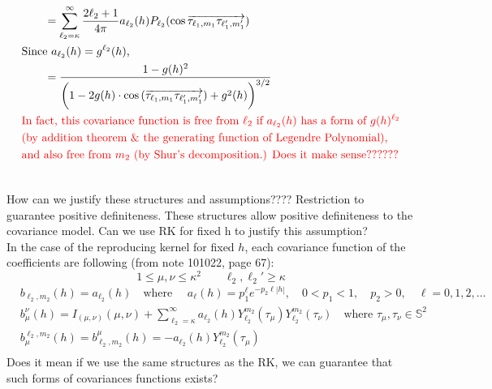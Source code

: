 \documentclass[11pt]{article}
\begin{document}
\begin{itemize}
\begin{align*}
&\quad \quad = \sum_{\ell_2=\kappa}^{\infty} \frac{2\ell_2 +1}{4\pi} a_{\ell_2}(h)  P_{\ell_2}(\cos{\overrightarrow{\tau_{\ell_1,m_1} \tau_{\ell_1',m_1'}}}) \\
&\text{Since $a_{\ell_2}(h) = g^{\ell_2}(h)$,}\\
& \quad \quad =\frac{1-g(h)^2}{\biggl(1-2 g(h) \cdot \cos{(\overrightarrow{\tau_{\ell_1,m_1} \tau_{\ell_1',m_1'}})} + g^2(h)\biggl)^{3/2}}\\
&\text{\color{red} In fact, this covariance function is free from $\ell_2$ if $a_{\ell_2}(h)$ has a form of $g(h)^{\ell_2}$}\\
&\text{\color{red} (by addition theorem \& the generating function of Legendre Polynomial), }\\
&\text{\color{red} and also free from $m_2$ (by Shur's decomposition.) Does it make sense??????}\\
\\
\end{align*}

{\color{red} How can we justify these structures and assumptions???? Restriction to guarantee positive definiteness. These structures allow positive definiteness to the covariance model. Can we use RK for fixed h to justify this assumption?}\\

{\color{red}
In the case of the reproducing kernel for fixed $h$, each covariance function of the coefficients are following (from note 101022, page 67): \\
$$1 \le \mu, \nu \le \kappa^2 \quad \quad \ell_2, {\ell_2}'  \ge \kappa$$ 
\begin{align*}
&b_{\ell_2,m_2}(h) = a_{\ell_2}(h) \quad \text{where } \quad a_\ell(h)=p_1^\ell e^{-p_2 \ell |h|}, \quad 0<p_1<1, \quad p_2>0, \quad \ell=0,1,2,\dots\\
&b_{\mu}^{\nu}(h) = I_{(\mu, \nu)}(\mu, \nu) + \sum_{\ell_2=\kappa}^{\infty} a_{\ell_2}(h) Y_{\ell_2}^{m_2}(\tau_\mu) Y_{\ell_2}^{m_2}(\tau_\nu)  \quad \text{where } \tau_\mu, \tau_\nu \in \mathbb{S}^2 \\
&b_{\mu}^{\ell_2,m_2}(h) = b_{\ell_2,m_2}^{\mu}(h) = -a_{\ell_2}(h) Y_{\ell_2}^{m_2}(\tau_\mu)\\
\end{align*}
Does it mean if we use the same structures as the RK, we can guarantee that such forms of covariances functions exists?\\
}


\end{itemize}
\end{document}
